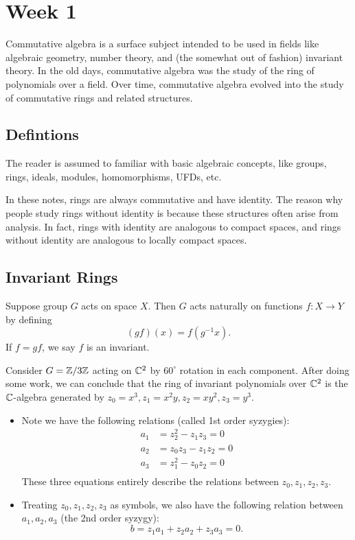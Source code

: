 \section{Week 1}
Commutative algebra is a surface subject intended to be used in fields like algebraic geometry, number theory, and (the somewhat out of fashion) invariant theory. In the old days, commutative algebra was the study of the ring of polynomials over a field. Over time, commutative algebra evolved into the study of commutative rings and related structures.

\subsection{Defintions}
The reader is assumed to familiar with basic algebraic concepts, like groups, rings, ideals, modules, homomorphisms, UFDs, etc.

In these notes, rings are always commutative and have identity. The reason why people study rings without identity is because these structures often arise from analysis. In fact, rings with identity are analogous to compact spaces, and rings without identity are analogous to locally compact spaces.

\subsection{Invariant Rings}
Suppose group $G$ acts on space $X$. Then $G$ acts naturally on functions $f: X \to Y$ by defining
\[
    (gf)(x) = f(g^{-1}x).
\]
If $f = gf$, we say $f$ is an invariant.

Consider $G = {\mathbb Z}/3{\mathbb Z}$ acting on ${\mathbb C}^2$ by $60^{\circ}$ rotation in each component. After doing some work, we can conclude that the ring of invariant polynomials over ${\mathbb C}^2$ is the ${\mathbb C}$-algebra generated by $z_0 = x^3, z_1 = x^2y, z_2 = xy^2, z_3 = y^3$.
\begin{itemize}
    \item Note we have the following relations (called 1st order syzygies):
    \[
        \begin{split}
            a_1 &= z_2^2 - z_1z_3 = 0\\
            a_2 &= z_0z_3 - z_1z_2 = 0\\
            a_3 &= z_1^2 - z_0z_2 = 0\\
        \end{split}
    \]
    These three equations entirely describe the relations between $z_0, z_1, z_2, z_3$.
    \item Treating $z_0, z_1, z_2, z_3$ as symbols, we also have the following relation between $a_1, a_2, a_3$ (the 2nd order syzygy):
    \[
        b = z_1a_1 + z_2a_2 + z_3a_3 = 0.
    \]
\end{itemize}

